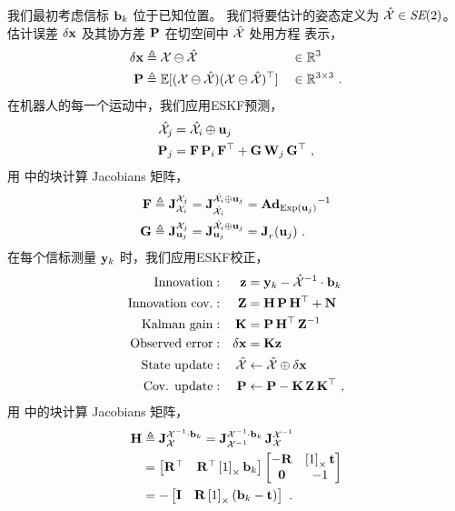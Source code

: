 我们最初考虑信标 ${\bf b}_k$ 位于已知位置。 
我们将要估计的姿态定义为 $\hat{\mathcal{X}}\in\textit{SE}(2)$。
估计误差 ${\delta{\bf x}}$ 及其协方差 ${\bf P}$ 在切空间中 $\hat{\mathcal{X}}$ 处用方程  表示，
%
\begin{align}\label{equ:loc_Gaussian}
{\delta{\bf x}} &\triangleq \mathcal{X}\ominus\hat{\mathcal{X}} && \in{\mathbb R}^3
\\
{\bf P} &\triangleq {\mathbb E}[(\mathcal{X}\ominus\hat{\mathcal{X}})(\mathcal{X}\ominus\hat{\mathcal{X}})^{\top}]&& \in{\mathbb R}^{3\times3}
~.
\end{align}
%
在机器人的每一个运动中，我们应用ESKF预测，
%
\begin{align}
\hat{\mathcal{X}}_j &= \hat{\mathcal{X}}_i\oplus{\bf u}_j \label{equ:loc_ekf_pred}
\\
{\bf P}_j &= {\bf F}\,{\bf P}_i\,{\bf F}^{\top} + {\bf G}\,{\bf W}_j\,{\bf G}^{\top}
~,
\end{align}
%
用  中的块计算 Jacobians 矩阵，
%
\begin{align*}
{\bf F} &\triangleq {{\bf J}^{\mathcal{X}_j}_{\mathcal{X}_i}} = {{\bf J}^{\hat{\mathcal{X}}_i\oplus{\bf u}_j}_{\hat{\mathcal{X}}_i}} 
= {\mathbf{Ad}_{\operatorname*{Exp}({\bf u}_j)}}^{-1}
\\
{\bf G} &\triangleq {{\bf J}^{\mathcal{X}_j}_{{\bf u}_j}} = {{\bf J}^{\hat{\mathcal{X}}_i\oplus{\bf u}_j}_{{\bf u}_j}} = {{\bf J}^{}_{r}}({\bf u}_j)
~.
\end{align*}
%
在每个信标测量 ${\bf y}_k$ 时，我们应用ESKF校正，
%
\begin{align}
\textrm{Innovation}&:&{\bf z} &= {\bf y}_k - \hat{\mathcal{X}}^{-1}\cdot{\bf b}_k \notag\\
\textrm{Innovation cov.}&:&{\bf Z} &= {\bf H}\,{\bf P}\,{\bf H}^{\top}+{\bf N} \notag\\
\textrm{Kalman gain}&:&{\bf K} &= {\bf P}\,{\bf H}^{\top}\,{\bf Z}^{-1} \notag\\
\textrm{Observed error}&:&{\delta{\bf x}} &= {\bf K}{\bf z} \notag\\
\textrm{State update}&:&\hat{\mathcal{X}} &\gets \hat{\mathcal{X}} \oplus {\delta{\bf x}} \label{equ:loc_ekf_corr}\\
\textrm{Cov. update}&:&{\bf P} &\gets {\bf P} - {\bf K}\,{\bf Z}\,{\bf K}^{\top}
~,
\end{align}
%
用  中的块计算 Jacobians 矩阵，
\begin{align*}
{\bf H} 
&\triangleq {{\bf J}^{\mathcal{X}^{-1}\cdot{\bf b}_k}_{\mathcal{X}}}= {{\bf J}^{\mathcal{X}^{-1}\cdot{\bf b}_k}_{\mathcal{X}^{-1}}}\,{{\bf J}^{\mathcal{X}^{-1}}_{\mathcal{X}}} 
\notag\\
&= 
\begin{bmatrix}{\bf R}^{\top} & {\bf R}^{\top}\left[1\right]_\times{\bf b}_k\end{bmatrix}
\begin{bmatrix}
-{\bf R} & \left[1\right]_\times{\bf t} \\ \bf0 & -1
\end{bmatrix}
\notag\\
&=
-\begin{bmatrix}{\bf I} & {\bf R}\left[1\right]_\times({\bf b}_k-{\bf t})\end{bmatrix}
~.
\end{align*}

